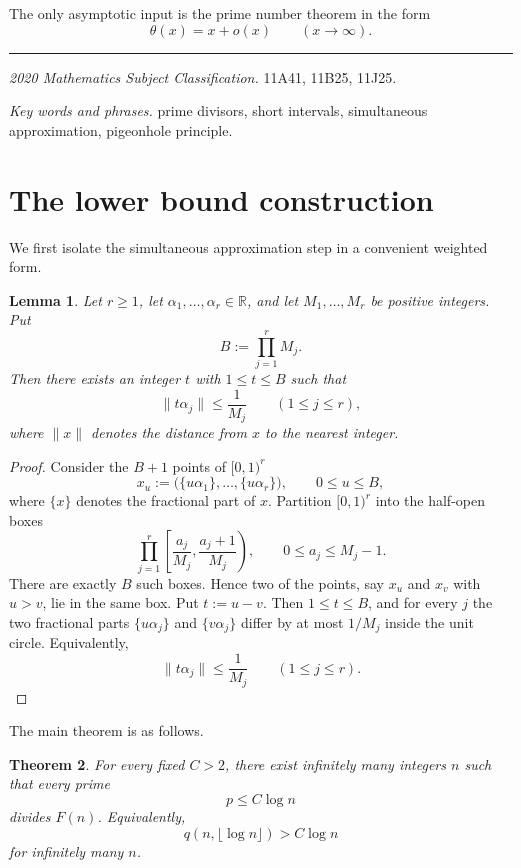 \documentclass[11pt]{article}
\newtheorem{lemma}{Lemma}[section]
\newtheorem{theorem}[lemma]{Theorem}
\begin{document}
The only asymptotic input is the prime number theorem in the form
\begin{equation}
\theta(x)=x+o(x)\qquad (x\to\infty).
\end{equation}

\bigskip
\noindent\rule{2cm}{0.4pt}

\noindent\textit{2020 Mathematics Subject Classification.} 11A41, 11B25, 11J25.

\noindent\textit{Key words and phrases.} prime divisors, short intervals, simultaneous approximation, pigeonhole principle.

\section{The lower bound construction}

We first isolate the simultaneous approximation step in a convenient weighted form.

\begin{lemma}
Let $r\ge 1$, let $\alpha_1,\dots,\alpha_r\in\mathbb{R}$, and let $M_1,\dots,M_r$ be positive integers. Put
\[
B:=\prod_{j=1}^r M_j.
\]
Then there exists an integer $t$ with $1\le t\le B$ such that
\[
\|t\alpha_j\|\le \frac{1}{M_j}\qquad (1\le j\le r),
\]
where $\|x\|$ denotes the distance from $x$ to the nearest integer.
\end{lemma}

\begin{proof}
Consider the $B+1$ points of $[0,1)^r$
\[
x_u:=\bigl(\{u\alpha_1\},\dots,\{u\alpha_r\}\bigr),\qquad 0\le u\le B,
\]
where $\{x\}$ denotes the fractional part of $x$. Partition $[0,1)^r$ into the half-open boxes
\[
\prod_{j=1}^r \left[\frac{a_j}{M_j},\frac{a_j+1}{M_j}\right),\qquad 0\le a_j\le M_j-1.
\]
There are exactly $B$ such boxes. Hence two of the points, say $x_u$ and $x_v$ with $u>v$, lie in the same box. Put $t:=u-v$. Then $1\le t\le B$, and for every $j$ the two fractional parts $\{u\alpha_j\}$ and $\{v\alpha_j\}$ differ by at most $1/M_j$ inside the unit circle. Equivalently,
\[
\|t\alpha_j\|\le \frac{1}{M_j}\qquad (1\le j\le r).
\]
\end{proof}

The main theorem is as follows.

\begin{theorem}
For every fixed $C>2$, there exist infinitely many integers $n$ such that every prime
\[
p\le C\log n
\]
divides $F(n)$. Equivalently,
\[
q(n,\lfloor \log n\rfloor)>C\log n
\]
for infinitely many $n$.
\end{theorem}
\end{document}
